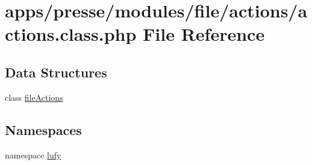 \hypertarget{presse_2modules_2file_2actions_2actions_8class_8php}{\section{apps/presse/modules/file/actions/actions.class.\-php File Reference}
\label{presse_2modules_2file_2actions_2actions_8class_8php}
}
\subsection*{Data Structures}
\begin{DoxyCompactItemize}
\item 
class \hyperlink{classfile_actions}{file\-Actions}
\end{DoxyCompactItemize}
\subsection*{Namespaces}
\begin{DoxyCompactItemize}
\item 
namespace \hyperlink{namespacelufy}{lufy}
\end{DoxyCompactItemize}
